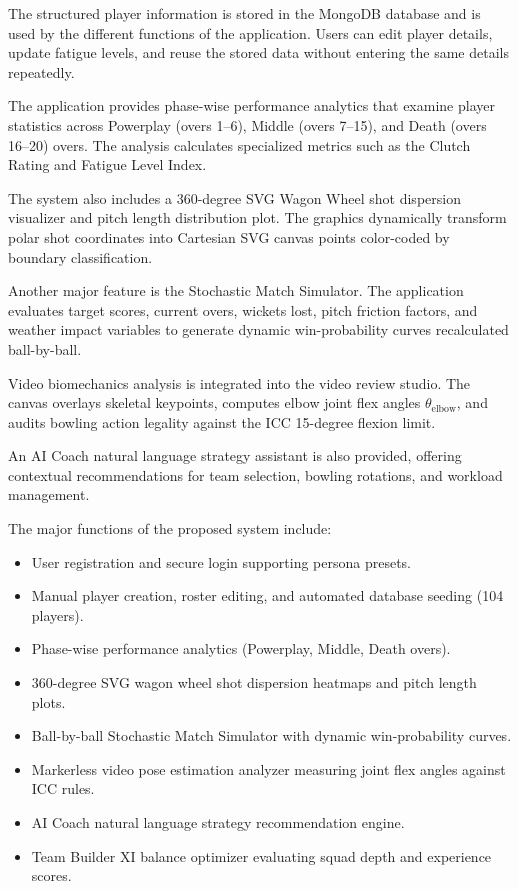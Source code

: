 The structured player information is stored in the MongoDB database and is used by the different functions of the application. Users can edit player details, update fatigue levels, and reuse the stored data without entering the same details repeatedly.

The application provides phase-wise performance analytics that examine player statistics across Powerplay (overs 1--6), Middle (overs 7--15), and Death (overs 16--20) overs. The analysis calculates specialized metrics such as the Clutch Rating and Fatigue Level Index.

The system also includes a 360-degree SVG Wagon Wheel shot dispersion visualizer and pitch length distribution plot. The graphics dynamically transform polar shot coordinates into Cartesian SVG canvas points color-coded by boundary classification.

Another major feature is the Stochastic Match Simulator. The application evaluates target scores, current overs, wickets lost, pitch friction factors, and weather impact variables to generate dynamic win-probability curves recalculated ball-by-ball.

Video biomechanics analysis is integrated into the video review studio. The canvas overlays skeletal keypoints, computes elbow joint flex angles $\theta_{\text{elbow}}$, and audits bowling action legality against the ICC 15-degree flexion limit.

An AI Coach natural language strategy assistant is also provided, offering contextual recommendations for team selection, bowling rotations, and workload management.

The major functions of the proposed system include:
\begin{itemize}
    \item User registration and secure login supporting persona presets.
    \item Manual player creation, roster editing, and automated database seeding (104 players).
    \item Phase-wise performance analytics (Powerplay, Middle, Death overs).
    \item 360-degree SVG wagon wheel shot dispersion heatmaps and pitch length plots.
    \item Ball-by-ball Stochastic Match Simulator with dynamic win-probability curves.
    \item Markerless video pose estimation analyzer measuring joint flex angles against ICC rules.
    \item AI Coach natural language strategy recommendation engine.
    \item Team Builder XI balance optimizer evaluating squad depth and experience scores.
\end{itemize}

